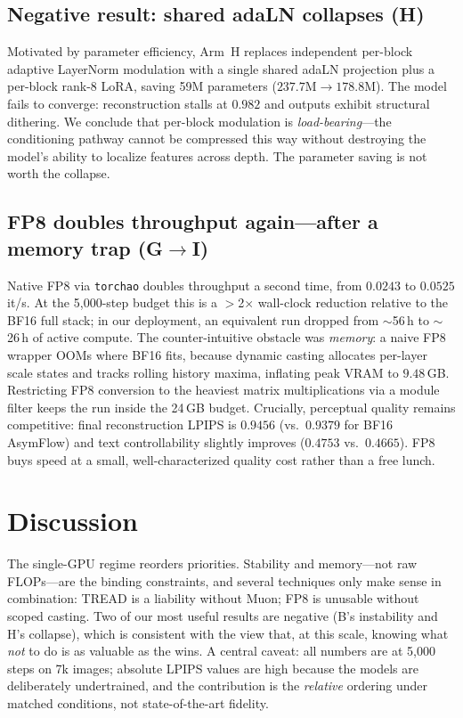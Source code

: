 \documentclass[10pt,twocolumn]{article}
\begin{document}
\subsection{Negative result: shared adaLN collapses (H)}
Motivated by parameter efficiency, Arm~H replaces independent per-block adaptive
LayerNorm modulation with a single shared adaLN projection plus a per-block
rank-8 LoRA, saving 59M parameters ($237.7\text{M}\to178.8\text{M}$). The model
fails to converge: reconstruction stalls at $0.982$ and outputs exhibit
structural dithering. We conclude that per-block modulation is
\emph{load-bearing}---the conditioning pathway cannot be compressed this way
without destroying the model's ability to localize features across depth. The
parameter saving is not worth the collapse.

\subsection{FP8 doubles throughput again---after a memory trap (G$\to$I)}
Native FP8 via \texttt{torchao} doubles throughput a second time, from $0.0243$
to $0.0525$ it/s. At the 5{,}000-step budget this is a $>$2$\times$ wall-clock
reduction relative to the BF16 full stack; in our deployment, an equivalent run
dropped from $\sim$56\,h to $\sim$26\,h of active compute. The
counter-intuitive obstacle was \emph{memory}: a naive FP8 wrapper OOMs where
BF16 fits, because dynamic casting allocates per-layer scale states and tracks
rolling history maxima, inflating peak VRAM to $9.48$\,GB. Restricting FP8
conversion to the heaviest matrix multiplications via a module filter keeps the
run inside the 24\,GB budget. Crucially, perceptual quality remains competitive:
final reconstruction LPIPS is $0.9456$ (vs.\ $0.9379$ for BF16 AsymFlow) and
text controllability slightly improves ($0.4753$ vs.\ $0.4665$). FP8 buys speed
at a small, well-characterized quality cost rather than a free lunch.

\section{Discussion}
The single-GPU regime reorders priorities. Stability and memory---not raw
FLOPs---are the binding constraints, and several techniques only make sense in
combination: TREAD is a liability without Muon; FP8 is unusable without scoped
casting. Two of our most useful results are negative (B's instability and H's
collapse), which is consistent with the view that, at this scale, knowing what
\emph{not} to do is as valuable as the wins. A central caveat: all numbers are
at 5{,}000 steps on 7k images; absolute LPIPS values are high because the models
are deliberately undertrained, and the contribution is the \emph{relative}
ordering under matched conditions, not state-of-the-art fidelity.
\end{document}
